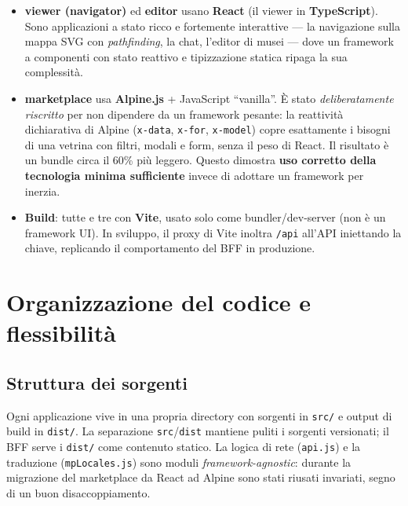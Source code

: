 \documentclass[11pt,a4paper]{article}
\newcommand{\code}[1]{\texttt{#1}}
\begin{document}
\begin{itemize}[leftmargin=1.3em]
  \item \textbf{viewer (navigator)} ed \textbf{editor} usano \textbf{React}
    (il viewer in \textbf{TypeScript}). Sono applicazioni a stato ricco e
    fortemente interattive --- la navigazione sulla mappa SVG con \emph{pathfinding},
    la chat, l'editor di musei --- dove un framework a componenti con stato
    reattivo e tipizzazione statica ripaga la sua complessità.
  \item \textbf{marketplace} usa \textbf{Alpine.js} + JavaScript ``vanilla''.
    È stato \emph{deliberatamente riscritto} per non dipendere da un framework
    pesante: la reattività dichiarativa di Alpine (\code{x-data},
    \code{x-for}, \code{x-model}) copre esattamente i bisogni di una vetrina con
    filtri, modali e form, senza il peso di React. Il risultato è un bundle
    circa il 60\% più leggero. Questo dimostra \textbf{uso corretto della
    tecnologia minima sufficiente} invece di adottare un framework per inerzia.
  \item \textbf{Build}: tutte e tre con \textbf{Vite}, usato solo come
    bundler/dev-server (non è un framework UI). In sviluppo, il proxy di Vite
    inoltra \code{/api} all'API iniettando la chiave, replicando il
    comportamento del BFF in produzione.
\end{itemize}

\section{Organizzazione del codice e flessibilità}

\subsection{Struttura dei sorgenti}
Ogni applicazione vive in una propria directory con sorgenti in \code{src/} e
output di build in \code{dist/}. La separazione \code{src}/\code{dist} mantiene
puliti i sorgenti versionati; il BFF serve i \code{dist/} come contenuto
statico. La logica di rete (\code{api.js}) e la traduzione (\code{mpLocales.js})
sono moduli \emph{framework-agnostic}: durante la migrazione del marketplace da
React ad Alpine sono stati riusati invariati, segno di un buon disaccoppiamento.
\end{document}
